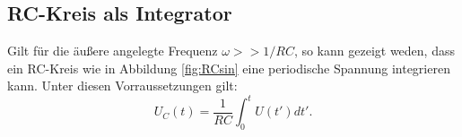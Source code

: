 \subsection{RC-Kreis als Integrator}
Gilt für die äußere angelegte Frequenz $\omega >> 1/RC$, so kann gezeigt weden, dass
ein RC-Kreis wie in Abbildung \ref{fig:RCsin} eine periodische Spannung integrieren kann.
Unter diesen Vorraussetzungen gilt:
\begin{equation}
  U_{C}(t)=\frac{1}{RC}\int_{0}^{t} U(t')dt'.
  \label{eqn:integral}
\end{equation}

\label{sec:Theorie}


